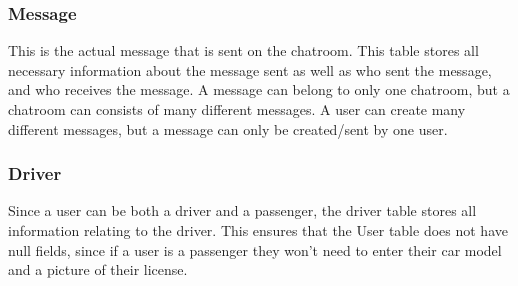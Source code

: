 \documentclass[hidelinks, 12pt, a4paper]{article}
\begin{document}
    
      \subsubsection{Message}
        This is the actual message that is sent on the chatroom. This table stores all necessary information about the message sent as well as who sent the message, and who receives the message. A message can belong to only one chatroom, but a chatroom can consists of many different messages. A user can create many different messages, but a message can only be created/sent by one user.

    \subsubsection{Driver}
    Since a user can be both a driver and a passenger, the driver table stores all information relating to the driver. This ensures that the User table does not have null fields, since if a user is a passenger they won’t need to enter their car model and a picture of their license.
         
    
    
\end{document}
